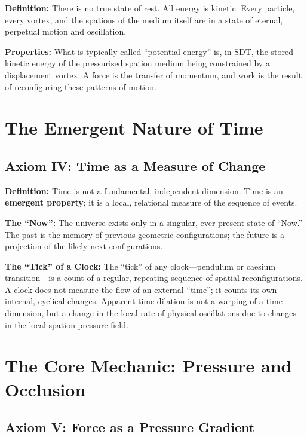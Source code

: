 \textbf{Definition:} There is no true state of rest.  All energy is kinetic.  Every particle, every vortex, and the spations of the medium itself are in a state of eternal, perpetual motion and oscillation.

\textbf{Properties:} What is typically called ``potential energy'' is, in SDT, the stored kinetic energy of the pressurised spation medium being constrained by a displacement vortex.  A force is the transfer of momentum, and work is the result of reconfiguring these patterns of motion.


\section{The Emergent Nature of Time}

\subsection{Axiom IV: Time as a Measure of Change}

\textbf{Definition:} Time is not a fundamental, independent dimension.  Time is an \textbf{emergent property}; it is a local, relational measure of the sequence of events.

\textbf{The ``Now'':} The universe exists only in a singular, ever-present state of ``Now.''  The past is the memory of previous geometric configurations; the future is a projection of the likely next configurations.

\textbf{The ``Tick'' of a Clock:} The ``tick'' of any clock---pendulum or caesium transition---is a count of a regular, repeating sequence of spatial reconfigurations.  A clock does not measure the flow of an external ``time''; it counts its own internal, cyclical changes.  Apparent time dilation is not a warping of a time dimension, but a change in the local rate of physical oscillations due to changes in the local spation pressure field.


\section{The Core Mechanic: Pressure and Occlusion}

\subsection{Axiom V: Force as a Pressure Gradient}

